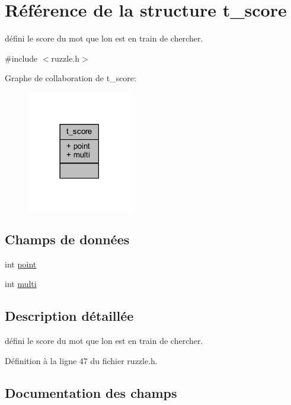\hypertarget{structt__score}{}\section{Référence de la structure t\+\_\+score}
\label{structt__score}


défini le score du mot que l\textquotesingle{}on est en train de chercher.  




{\ttfamily \#include $<$ruzzle.\+h$>$}



Graphe de collaboration de t\+\_\+score\+:
\nopagebreak
\begin{figure}[H]
\begin{center}
\leavevmode
\includegraphics[width=129pt]{d6/db1/structt__score__coll__graph}
\end{center}
\end{figure}
\subsection*{Champs de données}
\begin{DoxyCompactItemize}
\item 
int \hyperlink{structt__score_a2dee8b7fcecc7c2d190e9304b43ea886}{point}
\item 
int \hyperlink{structt__score_a75308cd0de4d855ff6cb9baec37dddde}{multi}
\end{DoxyCompactItemize}


\subsection{Description détaillée}
défini le score du mot que l\textquotesingle{}on est en train de chercher. 

Définition à la ligne 47 du fichier ruzzle.\+h.



\subsection{Documentation des champs}
\hypertarget{structt__score_a75308cd0de4d855ff6cb9baec37dddde}{}
